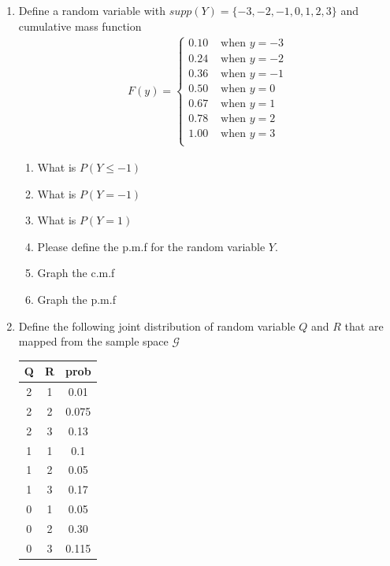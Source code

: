 \begin{enumerate}
    \item Define a random variable with $supp(Y) = \{-3,-2,-1,0,1,2,3\}$ and cumulative mass function 
    \begin{align*}
        F(y) = \begin{cases}
                  0.10  & \text{ when } y = -3\\
                  0.24  & \text{ when } y = -2\\
                  0.36  & \text{ when } y = -1\\
                  0.50  & \text{ when } y =  0\\
                  0.67  & \text{ when } y =  1\\
                  0.78  & \text{ when } y =  2\\
                  1.00  & \text{ when } y =  3\\
               \end{cases}
    \end{align*} 
    \begin{enumerate}
        \item What is $P(Y \leq -1)$
        \item What is $P(Y=-1)$
        \item What is $P(Y= 1)$
        \item Please define the p.m.f for the random variable $Y$.
        \item Graph the c.m.f
        \item Graph the p.m.f
    \end{enumerate}

    \item  Define the following joint distribution of random variable $Q$ and $R$ that are mapped from the sample space $\mathcal{G}$
    \begin{table}[ht!]
    \centering
    \begin{tabular}{c c | c}
        Q & R & prob \\
        \hline
        2 & 1 & 0.01\\
        2 & 2 & 0.075\\
        2 & 3 & 0.13\\
        1 & 1 & 0.1\\
        1 & 2 & 0.05\\
        1 & 3 & 0.17\\
        0 & 1 & 0.05\\
        0 & 2 & 0.30\\
        0 & 3 & 0.115
    \end{tabular}
    \end{table}


\end{enumerate}
